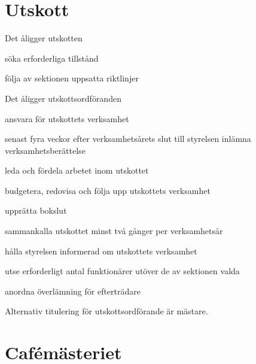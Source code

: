 \documentclass[pdfbookmarks,a4paper,11pt]{article}
\newlength{\itemcollength}
\newenvironment{reglemlista}{%
  \begin{list}{}{%
      \setlength{\labelwidth}{\itemcollength}%
      \setlength{\leftmargin}{\labelwidth + \labelsep}%
      \renewcommand{\makelabel}[1]{%
        \raisebox{0pt}[1ex][0pt]{%
          \makebox[\labelwidth][l]{%
            \parbox[t]{\itemcollength}{%
              \raggedright\hspace{0pt}##1}}}\hfill}%
      }}{%
  \end{list}}
\begin{document}
\section{Utskott}

\begin{reglemlista}

	\item[Åligganden]
	Det åligger utskotten
	\begin{attlista}
		\item söka erforderliga tillstånd
		\item följa av sektionen uppsatta riktlinjer
	\end{attlista}

	\item[Utskottsordföranden]
	Det åligger utskottsordföranden
	\begin{attlista}
		\item ansvara för utskottets verksamhet
		\item senast fyra veckor efter verksamhetsårets slut till styrelsen inlämna verksamhetsberättelse
		\item leda och fördela arbetet inom utskottet
		\item budgetera, redovisa och följa upp utskottets verksamhet
		\item upprätta bokslut
		\item sammankalla utskottet minst två gånger per verksamhetsår
		\item hålla styrelsen informerad om utskottets verksamhet
		\item utse erforderligt antal funktionärer utöver de av sektionen valda
		\item anordna överlämning för efterträdare
	\end{attlista}

	\item[Titulering]
	Alternativ titulering för utskottsordförande är mästare.

\end{reglemlista}

\section{Cafémästeriet}
\end{document}

